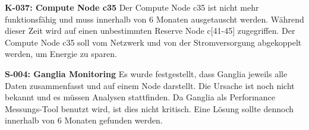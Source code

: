 \textbf{K-037: Compute Node c35} \newline
Der Compute Node c35 ist nicht mehr funktionsfähig und muss innerhalb von 6 Monaten ausgetauscht werden. Während dieser Zeit wird auf einen unbestimmten Reserve Node c[41-45] zugegriffen. Der Compute Node c35 soll vom Netzwerk und von der Stromversorgung abgekoppelt werden, um Energie zu sparen. \newline

\textbf{S-004: Ganglia Monitoring} \newline
Es wurde festgestellt, dass Ganglia jeweils alle Daten zusammenfasst und auf einem Node darstellt. Die Ursache ist noch nicht bekannt und es müssen Analysen stattfinden. Da Ganglia als Performance Messungs-Tool benutzt wird, ist dies nicht kritisch. Eine Lösung sollte dennoch innerhalb von 6 Monaten gefunden werden.
